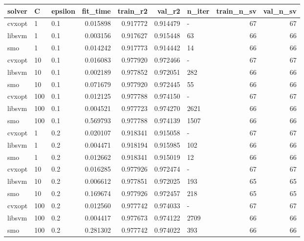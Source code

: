 \begin{tabular}{lllrrrlrr}
\toprule
solver &   C & epsilon &  fit\_time &  train\_r2 &   val\_r2 & n\_iter &  train\_n\_sv &  val\_n\_sv \\
\midrule
cvxopt &   1 &     0.1 &  0.015898 &  0.917772 & 0.914479 &      - &          67 &        67 \\
libsvm &   1 &     0.1 &  0.003156 &  0.917627 & 0.915448 &     63 &          66 &        66 \\
   smo &   1 &     0.1 &  0.014242 &  0.917773 & 0.914442 &     14 &          66 &        66 \\
cvxopt &  10 &     0.1 &  0.016083 &  0.977920 & 0.972466 &      - &          67 &        67 \\
libsvm &  10 &     0.1 &  0.002189 &  0.977852 & 0.972051 &    282 &          66 &        66 \\
   smo &  10 &     0.1 &  0.071679 &  0.977920 & 0.972445 &     55 &          66 &        66 \\
cvxopt & 100 &     0.1 &  0.012125 &  0.977788 & 0.974150 &      - &          67 &        67 \\
libsvm & 100 &     0.1 &  0.004521 &  0.977723 & 0.974270 &   2621 &          66 &        66 \\
   smo & 100 &     0.1 &  0.569793 &  0.977788 & 0.974139 &   1507 &          66 &        66 \\
cvxopt &   1 &     0.2 &  0.020107 &  0.918341 & 0.915058 &      - &          67 &        67 \\
libsvm &   1 &     0.2 &  0.004471 &  0.918194 & 0.915985 &    102 &          66 &        66 \\
   smo &   1 &     0.2 &  0.012662 &  0.918341 & 0.915019 &     12 &          66 &        66 \\
cvxopt &  10 &     0.2 &  0.016285 &  0.977926 & 0.972474 &      - &          67 &        67 \\
libsvm &  10 &     0.2 &  0.006612 &  0.977851 & 0.972025 &    193 &          65 &        65 \\
   smo &  10 &     0.2 &  0.169674 &  0.977926 & 0.972457 &    218 &          65 &        65 \\
cvxopt & 100 &     0.2 &  0.012560 &  0.977742 & 0.974033 &      - &          67 &        67 \\
libsvm & 100 &     0.2 &  0.004417 &  0.977673 & 0.974122 &   2709 &          66 &        66 \\
   smo & 100 &     0.2 &  0.281302 &  0.977742 & 0.974022 &    393 &          66 &        66 \\

\end{tabular}
